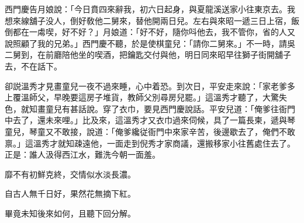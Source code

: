 西門慶告月娘說：「今日賁四來辭我，初六日起身，與夏龍溪送家小往東京去。我想來線舖子没人，倒好敎他二舅來，替他開兩日兒。左右與來昭一遞三日上宿，飯倒都在一䖏喫，好不好？」月娘道：「好不好，隨你呌他去，我不管你，省的人又說照顧了我的兄弟。」西門慶不聽，於是使棋童兒：「請你二舅來。」不一時，請吳二舅到，在前廳陪他坐的喫酒，把鑰匙交付與他，明日同來昭早往獅子街開舖子去，不在話下。

卻説溫秀才見畫童兒一夜不過來睡，心中着恐。到次日，平安走來說：「家老爹多上覆溫師父，早晚要這房子堆貨，教師父別尋房兒罷。」這溫秀才聽了，大驚失色，就知畫童兒有甚話說。穿了衣巾，要見西門慶說話。平安兒道：「俺爹往衙門中去了，還未來哩。」比及來，這溫秀才又衣巾過來伺候，具了一篇長柬，遞與琴童兒，琴童又不敢接，說道：「俺爹纔従衙門中來家辛苦，後邊歇去了，俺們不敢禀。」這溫秀才就知疎遠他，一面走到倪秀才家商議，還搬移家小往舊處住去了。正是：誰人汲得西江水，難洗今朝一面羞。

\begin{myquote}
靡不有初鮮克終，交情似水淡長濃。

自古人無千日好，果然花無摘下紅。
\end{myquote}

畢竟未知後來如何，且聽下回分解。

